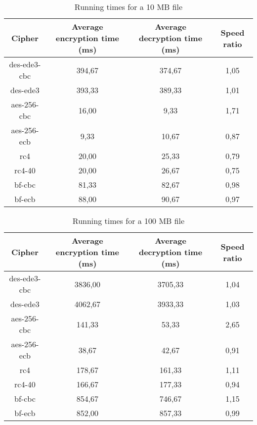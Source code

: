 \documentclass{article}
\begin{document}
\begin{table}
	\centering
	\caption{Running times for a 10 MB file}
	\begin{tabular}[t]{|| c c c c ||}
		\hline
		Cipher & Average encryption time (ms) & Average decryption time (ms) & Speed ratio \\  [0.5ex]
		\hline\hline
		des-ede3-cbc & 394,67 & 374,67 & 1,05      \\
		\hline
		des-ede3     & 393,33 & 389,33 & 1,01        \\
		\hline
		aes-256-cbc & 16,00 & 9,33 & 1,71 \\
		\hline
		aes-256-ecb & 9,33 & 10,67 & 0,87 \\
		\hline
		rc4 & 20,00 & 25,33 & 0,79 \\
		\hline
		rc4-40 & 20,00 & 26,67 & 0,75 \\
		\hline
		bf-cbc & 81,33 & 82,67 & 0,98 \\
		\hline
		bf-ecb & 88,00 & 90,67 & 0,97 \\
		\hline
	\end{tabular}
\end{table}

\begin{table}
	\centering
	\caption{Running times for a 100 MB file}
	\begin{tabular}[t]{|| c c c c ||}
		\hline
		Cipher & Average encryption time (ms) & Average decryption time (ms) & Speed ratio \\  [0.5ex]
		\hline\hline
		des-ede3-cbc & 3836,00 & 3705,33 & 1,04      \\
		\hline
		des-ede3     & 4062,67 & 3933,33 & 1,03        \\
		\hline
		aes-256-cbc & 141,33 & 53,33 & 2,65 \\
		\hline
		aes-256-ecb & 38,67 & 42,67 & 0,91 \\
		\hline
		rc4 & 178,67 & 161,33 & 1,11 \\
		\hline
		rc4-40  & 166,67 & 177,33 & 0,94 \\
		\hline
		bf-cbc & 854,67 & 746,67 & 1,15 \\
		\hline 
		bf-ecb & 852,00 & 857,33 & 0,99 \\
		\hline
	\end{tabular}
\end{table}
\end{document}
